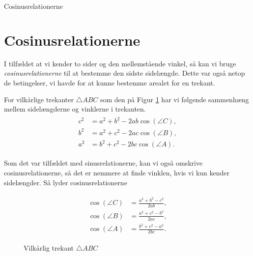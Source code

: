 \begin{center}
\Huge
	Cosinusrelationerne
\end{center}

\section*{Cosinusrelationerne}

I tilfældet at vi kender to sider og den mellemstående vinkel, så kan vi bruge \textit{cosinusrelationerne} til at bestemme den sidste sidelængde. Dette var også netop de betingelser, vi havde for at kunne bestemme arealet for en trekant. 

\begin{setn}[Cosinusrelationerne]
	\label{setn:cosinusrelationerne}
	For vilkårlige trekanter $\triangle ABC$ som den på Figur \ref{fig:vilkårlig} har vi følgende sammenhæng
	mellem sidelængderne og vinklerne i trekanten.
	\begin{align}
	\label{eq:cos1}
	\begin{split}
		c^2 &= a^2 + b^2 - 2ab\cos(\angle C),  \\
		b^2 &= a^2 + c^2 - 2ac\cos(\angle B), \\
		a^2 &= b^2 + c^2 - 2bc\cos(\angle A).
	\end{split}
	\end{align}
\end{setn}

Som det var tilfældet med sinusrelationerne, kan vi også omskrive cosinusrelationerne, så det er nemmere at finde vinklen, hvis vi kun kender sidelængder. Så lyder cosinusrelationerne

\begin{align}
	\label{eq:cos2}
	\begin{split}
	\cos(\angle C) &= \frac{a^2 + b^2 - c^2}{2ab},\\
	\cos(\angle B) &= \frac{a^2 + c^2 - b^2}{2ac},\\
	\cos(\angle A) &= \frac{b^2 + c^2 - a^2}{2bc}.
	\end{split}
\end{align}

\begin{figure}[H]
	\centering
	\caption{Vilkårlig trekant $\triangle ABC$}
	\label{fig:vilkårlig}
\end{figure}

